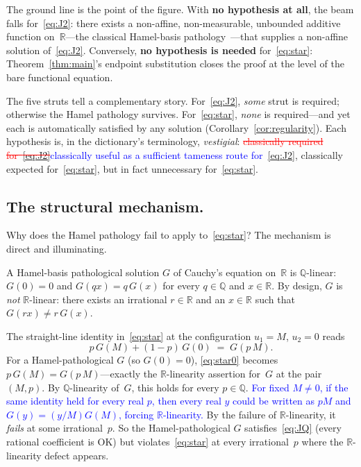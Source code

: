 \documentclass{article}
\newcommand{\ReviewAdd}[1]{\textcolor{blue}{#1}}
\newcommand{\ReviewDel}[1]{\textcolor{red}{\sout{#1}}}
\theoremstyle{plain}
\theoremstyle{definition}
\newcommand{\R}{\mathbb{R}}
\newcommand{\Q}{\mathbb{Q}}
\begin{document}
The ground line is the point of the figure. With \textbf{no
hypothesis at all}, the beam falls for~\eqref{eq:J2}: there exists a
non-affine, non-measurable, unbounded additive function
on~$\R$---the classical Hamel-basis pathology~\cite{Hamel1905}---that
supplies a non-affine solution of~\eqref{eq:J2}. Conversely,
\textbf{no hypothesis is needed} for~\eqref{eq:star}:
Theorem~\ref{thm:main}'s endpoint substitution closes the proof at
the level of the bare functional equation.

The five struts tell a complementary story. For~\eqref{eq:J2},
\emph{some} strut is required; otherwise the Hamel pathology
survives. For~\eqref{eq:star}, \emph{none} is required---and yet each
is automatically satisfied by any solution
(Corollary~\ref{cor:regularity}). Each hypothesis is, in the
dictionary's terminology, \emph{vestigial}: \ReviewDel{classically required
for~\eqref{eq:J2}}\ReviewAdd{classically useful as a sufficient tameness route for~\eqref{eq:J2}}, classically expected for~\eqref{eq:star}, but in
fact unnecessary for~\eqref{eq:star}.

\subsection{The structural mechanism.}
\label{ssec:mechanism}

Why does the Hamel pathology fail to apply to~\eqref{eq:star}? The
mechanism is direct and illuminating.

A Hamel-basis pathological solution $G$ of Cauchy's equation on~$\R$ is
$\Q$-linear: $G(0)=0$ and $G(qx)=q\,G(x)$ for every $q\in\Q$ and
$x\in\R$. By design, $G$ is \emph{not} $\R$-linear: there exists an
irrational $r\in\R$ and an $x\in\R$ such that $G(rx)\ne r\,G(x)$.

The straight-line identity in~\eqref{eq:star} at the configuration $u_1=M$,
$u_2=0$ reads
\begin{equation}
p\,G(M)+(1-p)\,G(0) \;=\; G(p\,M).
\tag{$\star_0$}\label{eq:star0}
\end{equation}
For a Hamel-pathological $G$ (so $G(0)=0$), \eqref{eq:star0} becomes
$p\,G(M)=G(p\,M)$---exactly the $\R$-linearity assertion for~$G$ at the
pair $(M,p)$. By $\Q$-linearity of~$G$, this holds for every $p\in\Q$.
\ReviewAdd{For fixed $M\ne0$, if the same identity held for every real $p$, then every real $y$ could be written as $pM$ and $G(y)=(y/M)G(M)$, forcing $\R$-linearity.}
By the failure of $\R$-linearity, it \emph{fails} at some irrational~$p$.
So the Hamel-pathological $G$ satisfies~\eqref{eq:JQ} (every rational
coefficient is OK) but violates~\eqref{eq:star} at every irrational~$p$
where the $\R$-linearity defect appears.
\end{document}
